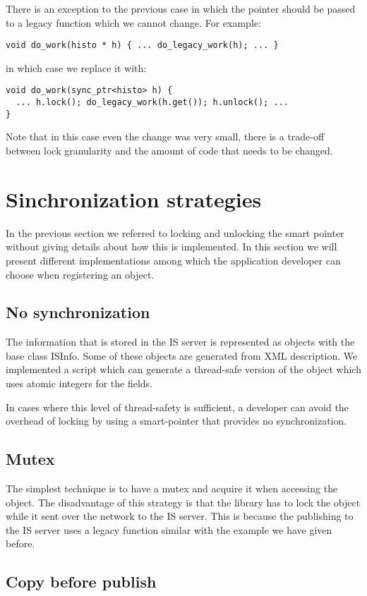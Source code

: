 There is an exception to the previous case in which the pointer should be passed to a legacy function which we cannot change. For example:

\verb+void do_work(histo * h) { ... do_legacy_work(h); ... }+

in which case we replace it with:
\begin{verbatim}
void do_work(sync_ptr<histo> h) { 
  ... h.lock(); do_legacy_work(h.get()); h.unlock(); ...
}
\end{verbatim}
Note that in this case even the change was very small, there is a trade-off between lock granularity and the amount of code that needs to be changed. 


\section*{Sinchronization strategies}
In the previous section we referred to locking and unlocking the smart pointer without giving details about how this is implemented. In this section we will present different implementations among which the application developer can choose when registering an object.

\subsection*{No synchronization}

The information that is stored in the IS server is represented as objects with the base class ISInfo. Some of these objects are generated from XML description. We implemented a script which can generate a thread-safe version of the object which uses atomic integers for the fields. 

In cases where this level of thread-safety is sufficient, a developer can avoid the overhead of locking by using a smart-pointer that provides no synchronization.

\subsection*{Mutex}

The simplest technique is to have a mutex and acquire it when accessing the object. The disadvantage of this strategy is that the library has to lock the object while it sent over the network to the IS server. This is because the publishing to the IS server uses a legacy function similar with the example we have given before.

\subsection*{Copy before publish}

